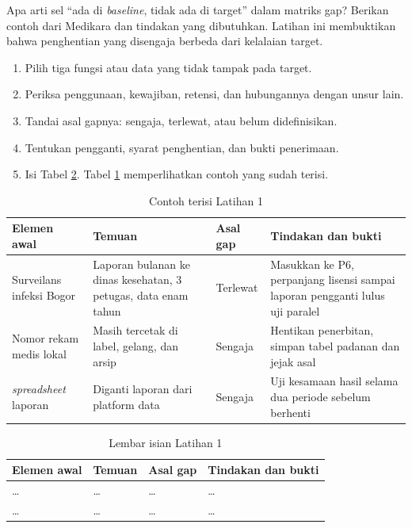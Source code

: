 Apa arti sel ``ada di \textit{baseline}, tidak ada di target'' dalam matriks gap? Berikan contoh dari Medikara dan tindakan yang dibutuhkan. Latihan ini membuktikan bahwa penghentian yang disengaja berbeda dari kelalaian target.

\begin{enumerate}
  \item Pilih tiga fungsi atau data yang tidak tampak pada target.
  \item Periksa penggunaan, kewajiban, retensi, dan hubungannya dengan unsur lain.
  \item Tandai asal gapnya: sengaja, terlewat, atau belum didefinisikan.
  \item Tentukan pengganti, syarat penghentian, dan bukti penerimaan.
  \item Isi Tabel \ref{tab:ch11-lat1-hasil}. Tabel \ref{tab:ch11-lat1-contoh} memperlihatkan contoh yang sudah terisi.
\end{enumerate}

\begin{table}[!htb]
  \centering
  \caption{Contoh terisi Latihan 1}
  \label{tab:ch11-lat1-contoh}
  \small
  \begin{tabularx}{\textwidth}{>{\raggedright\arraybackslash}p{2.9cm}>{\raggedright\arraybackslash}X>{\raggedright\arraybackslash}p{1.8cm}>{\raggedright\arraybackslash}X}
    \hline
    \textbf{Elemen awal} & \textbf{Temuan} & \textbf{Asal gap} & \textbf{Tindakan dan bukti} \\ \hline
    Surveilans infeksi Bogor & Laporan bulanan ke dinas kesehatan, 3 petugas, data enam tahun & Terlewat & Masukkan ke P6, perpanjang lisensi sampai laporan pengganti lulus uji paralel \\ \hline
    Nomor rekam medis lokal & Masih tercetak di label, gelang, dan arsip & Sengaja & Hentikan penerbitan, simpan tabel padanan dan jejak asal \\ \hline
    23 \textit{spreadsheet} laporan & Diganti laporan dari platform data & Sengaja & Uji kesamaan hasil selama dua periode sebelum berhenti \\ \hline
  \end{tabularx}
\end{table}

\begin{table}[!htb]
  \centering
  \caption{Lembar isian Latihan 1}
  \label{tab:ch11-lat1-hasil}
  \small
  \begin{tabularx}{\textwidth}{>{\raggedright\arraybackslash}p{2.9cm}>{\raggedright\arraybackslash}X>{\raggedright\arraybackslash}p{1.8cm}>{\raggedright\arraybackslash}X}
    \hline
    \textbf{Elemen awal} & \textbf{Temuan} & \textbf{Asal gap} & \textbf{Tindakan dan bukti} \\ \hline
    \dots & \dots & \dots & \dots \\ \hline
    \dots & \dots & \dots & \dots \\ \hline
  \end{tabularx}
\end{table}

